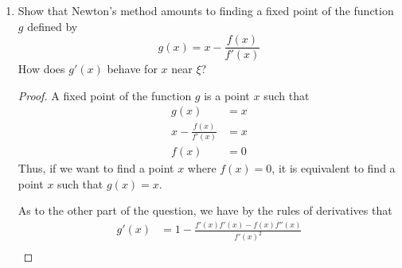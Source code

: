 \documentclass[../psets.tex]{subfiles}
\begin{document}
\begin{enumerate}[label={\textbf{\arabic*.}}]
\begin{enumerate}
\begin{proof}
            We have from part (b) that $x_i>\xi$ for all $i\in\N$, so naturally $0\leq x_{n+1}-\xi$. As to the other part of the question, we induct on $n$. For the base case $n=1$, we have that
            \begin{align*}
                x_2-\xi &= \frac{f''(t_1)}{2f'(x_1)}(x_1-\xi)^2\\
                &\leq \frac{M}{2\delta}(x_1-\xi)^2\\
                &= \frac{2\delta}{M}\left[ \frac{M}{2\delta}(x_1-\xi) \right]^2\\
                &= \frac{1}{A}[A(x_1-\xi)]^{2\cdot 1}
            \end{align*}
            Now suppose inductively that we have proven the claim for $n-1$; we now seek to prove it for $n$. Indeed, we have that
            \begin{align*}
                x_{n+1}-\xi &= \frac{f''(t_n)}{2f'(x_n)}(x_n-\xi)^2\\
                &\leq \frac{M}{2\delta}(x_n-\xi)^2\\
                &\leq A\left( \frac{1}{A}[A(x_1-\xi)]^{2(n-1)} \right)^2\\
                &= \frac{1}{A}[A(x_1-\xi)]^{2n}
            \end{align*}
            as desired.
        \end{proof}
        \item Show that Newton's method amounts to finding a fixed point of the function $g$ defined by
        \begin{equation*}
            g(x) = x-\frac{f(x)}{f'(x)}
        \end{equation*}
        How does $g'(x)$ behave for $x$ near $\xi$?
        \begin{proof}
            A fixed point of the function $g$ is a point $x$ such that
            \begin{align*}
                g(x) &= x\\
                x-\frac{f(x)}{f'(x)} &= x\\
                f(x) &= 0
            \end{align*}
            Thus, if we want to find a point $x$ where $f(x)=0$, it is equivalent to find a point $x$ such that $g(x)=x$.\par
            As to the other part of the question, we have by the rules of derivatives that
            \begin{align*}
                g'(x) &= 1-\frac{f'(x)f'(x)-f(x)f''(x)}{f'(x)^2}\\

\end{align*}
\end{proof}
\end{enumerate}
\end{enumerate}
\end{document}
